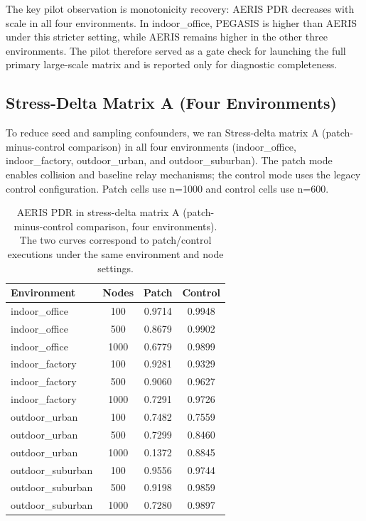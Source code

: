 ﻿\documentclass[sensors,article,submit,moreauthors,pdftex]{Definitions/mdpi}
\begin{document}
The key pilot observation is monotonicity recovery: AERIS PDR decreases with scale in all four environments. In indoor\_office, PEGASIS is higher than AERIS under this stricter setting, while AERIS remains higher in the other three environments. The pilot therefore served as a gate check for launching the full primary large-scale matrix and is reported only for diagnostic completeness.

\subsection{Stress-Delta Matrix A (Four Environments)}
To reduce seed and sampling confounders, we ran Stress-delta matrix A (patch-minus-control comparison) in all four environments (indoor\_office, indoor\_factory, outdoor\_urban, and outdoor\_suburban). The patch mode enables collision and baseline relay mechanisms; the control mode uses the legacy control configuration. Patch cells use n=1000 and control cells use n=600.

\begin{table}[H]
\caption{AERIS PDR in stress-delta matrix A (patch-minus-control comparison, four environments). The two curves correspond to patch/control executions under the same environment and node settings.}
\label{tab:s9_patch_control}
\centering
\begin{tabular}{lccc}
\toprule
Environment & Nodes & Patch & Control \\
\midrule
indoor\_office & 100  & 0.9714 & 0.9948 \\
indoor\_office & 500  & 0.8679 & 0.9902 \\
indoor\_office & 1000 & 0.6779 & 0.9899 \\
indoor\_factory & 100  & 0.9281 & 0.9329 \\
indoor\_factory & 500  & 0.9060 & 0.9627 \\
indoor\_factory & 1000 & 0.7291 & 0.9726 \\
outdoor\_urban & 100  & 0.7482 & 0.7559 \\
outdoor\_urban & 500  & 0.7299 & 0.8460 \\
outdoor\_urban & 1000 & 0.1372 & 0.8845 \\
outdoor\_suburban & 100  & 0.9556 & 0.9744 \\
outdoor\_suburban & 500  & 0.9198 & 0.9859 \\
outdoor\_suburban & 1000 & 0.7280 & 0.9897 \\
\bottomrule
\end{tabular}
\end{table}
\end{document}
